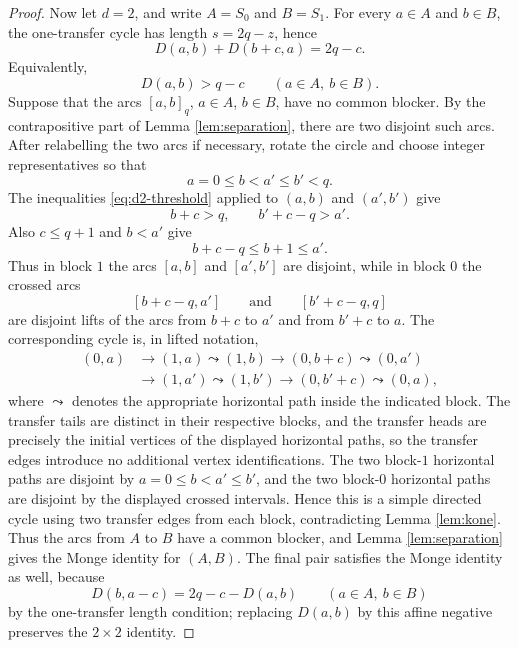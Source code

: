 \documentclass[10pt,a4paper]{amsart}
\begin{document}
\begin{proof}
Now let $d=2$, and write $A=S_0$ and $B=S_1$.  For every $a\in A$ and $b\in B$, the one-transfer cycle has length $s=2q-z$, hence
\[
        D(a,b)+D(b+c,a)=2q-c .
\]
Equivalently,
\begin{equation}
        D(a,b)>q-c
        \qquad(a\in A,\ b\in B).
        \label{eq:d2-threshold}
\end{equation}
Suppose that the arcs $[a,b]_q$, $a\in A$, $b\in B$, have no common blocker.  By the contrapositive part of Lemma \ref{lem:separation}, there are two disjoint such arcs.  After relabelling the two arcs if necessary, rotate the circle and choose integer representatives so that
\[
        a=0\le b<a'\le b'<q .
\]
The inequalities \eqref{eq:d2-threshold} applied to $(a,b)$ and $(a',b')$ give
\[
        b+c>q,
        \qquad
        b'+c-q>a' .
\]
Also $c\le q+1$ and $b<a'$ give
\[
        b+c-q\le b+1\le a' .
\]
Thus in block $1$ the arcs $[a,b]$ and $[a',b']$ are disjoint, while in block $0$ the crossed arcs
\[
        [b+c-q,a']
        \qquad\text{and}\qquad
        [b'+c-q,q]
\]
are disjoint lifts of the arcs from $b+c$ to $a'$ and from $b'+c$ to $a$.  The corresponding cycle is, in lifted notation,
\[
\begin{aligned}
        (0,a)&\to(1,a)\leadsto(1,b)\to(0,b+c)
        \leadsto(0,a')  \\
        &\to(1,a')\leadsto(1,b')\to(0,b'+c)
        \leadsto(0,a),
\end{aligned}
\]
where $\leadsto$ denotes the appropriate horizontal path inside the indicated
block.  The transfer tails are distinct in their respective blocks, and the
transfer heads are precisely the initial vertices of the displayed horizontal
paths, so the transfer edges introduce no additional vertex identifications.
The two block-$1$ horizontal paths are disjoint by $a=0\le b<a'\le b'$, and the
two block-$0$ horizontal paths are disjoint by the displayed crossed intervals.
Hence this is a simple directed cycle using two transfer edges from each block,
contradicting Lemma \ref{lem:kone}.  Thus the arcs from $A$ to $B$ have a common
blocker, and Lemma \ref{lem:separation} gives the Monge identity for $(A,B)$.
The final pair satisfies the Monge identity as well, because
\[
        D(b,a-c)=2q-c-D(a,b)
        \qquad(a\in A,\ b\in B)
\]
by the one-transfer length condition; replacing $D(a,b)$ by this affine negative preserves the $2\times2$ identity.


\end{proof}
\end{document}

